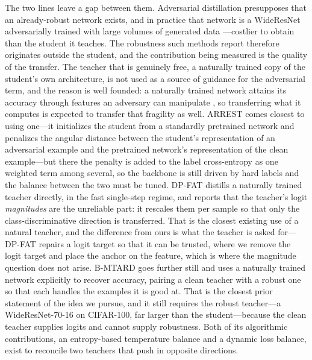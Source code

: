 The two lines leave a gap between them. Adversarial distillation presupposes that an already-robust
network exists, and in practice that network is a WideResNet adversarially trained with large volumes
of generated data \citep{wang2023better}---costlier to obtain than the student it teaches. The
robustness such methods report therefore originates outside the student, and the contribution being
measured is the quality of the transfer. The teacher that is genuinely free, a naturally trained copy
of the student's own architecture, is not used as a source of guidance for the adversarial term, and
the reason is well founded: a naturally trained network attains its accuracy through features an
adversary can manipulate \citep{ilyas2019adversarial}, so transferring what it computes is expected to
transfer that fragility as well. ARREST \citep{suzuki2023adversarial} comes closest to using
one---it initializes the student from a standardly pretrained network and penalizes the angular
distance between the student's representation of an adversarial example and the pretrained network's
representation of the clean example---but there the penalty is added to the label cross-entropy as one
weighted term among several, so the backbone is still driven by hard labels and the balance between
the two must be tuned. DP-FAT \citep{cho2026direction} distills a naturally
trained teacher directly, in the fast single-step regime, and reports that the teacher's logit
\emph{magnitudes} are the unreliable part: it rescales them per sample so that only the
class-discriminative direction is transferred. That is the closest existing use of a natural teacher,
and the difference from ours is what the teacher is asked for---DP-FAT repairs a logit target so that
it can be trusted, where we remove the logit target and place the anchor on the feature, which is
where the magnitude question does not arise. B-MTARD \citep{zhao2024mitigating} goes further still and
uses a naturally trained network explicitly to recover accuracy, pairing a clean teacher with a robust
one so that each handles the examples it is good at. That is the closest prior statement of the idea we pursue, and it
still requires the robust teacher---a WideResNet-70-16 on CIFAR-100, far larger than the
student---because the clean teacher supplies logits and cannot supply robustness. Both of its
algorithmic contributions, an entropy-based temperature balance and a dynamic loss balance, exist to
reconcile two teachers that push in opposite directions.

